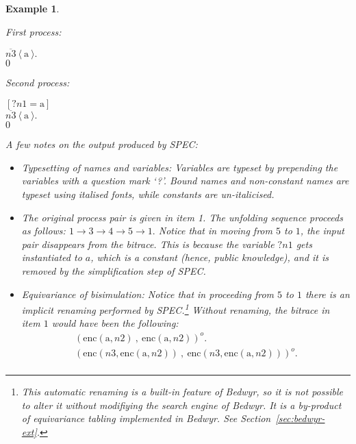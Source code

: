 \documentclass{article}
\newenvironment{example}{\begin{exa} \rm}{\end{exa}}
\newtheorem{exa}[theorem]{Example}
\begin{document}
\begin{example}
\begin{enumerate}
First process: 
\begin{tabbing}$\overline{n3}~\langle ~{\mathrm{a}} ~ \rangle.$ \\ 
$0$ \\ 
\end{tabbing}
Second process: 
\begin{tabbing}${[?n1 = {\mathrm{a}} ]}$ \\ 
$\overline{n3}~\langle ~{\mathrm{a}} ~ \rangle.$ \\ 
$0$ \\ 
\end{tabbing}
\end{enumerate}
A few notes on the output produced by SPEC:
\begin{itemize}
\item {\em Typesetting of names and variables}: 
Variables are typeset by prepending the variables with a question mark `?'. 
Bound names and non-constant names are typeset using italised fonts, while constants
are un-italicised. 

\item The original process pair is given in item 1. The unfolding sequence
proceeds as follows: $1 \to 3 \to 4 \to 5 \to 1.$ 
Notice that in moving from $5$ to $1$, the input pair disappears from the bitrace.
This is because the variable $?n1$ gets instantiated to $a$, which is a constant (hence,
public knowledge), and it is removed by the simplification step of SPEC. 

\item {\em Equivariance of bisimulation}: Notice that in proceeding from $5$ to $1$
there is an implicit renaming performed by SPEC.\footnote{This automatic renaming is
a built-in feature of Bedwyr, so it is not possible to alter it without modifiying
the search engine of Bedwyr. It is a by-product of {\em equivariance tabling} implemented
in Bedwyr. See Section~\ref{sec:bedwyr-ext}.} 
Without renaming, the bitrace in item $1$ would have been the following: 
$$
\begin{array}{l}
(\mbox{enc}({\mathrm{a}},n2)~ , ~ \mbox{enc}({\mathrm{a}},n2))^o. \\
(\mbox{enc}(n3,\mbox{enc}({\mathrm{a}},n2))~ , ~ \mbox{enc}(n3,\mbox{enc}({\mathrm{a}},n2)))^o. \\
\end{array}
$$

\end{itemize}

\end{example}
\end{document}
